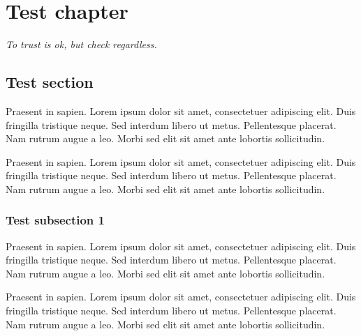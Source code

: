 

\chapter*{Test chapter}

\begin{flushright}
\parbox{0.6\textwidth}{
\emph{To trust is ok, but check regardless. \newline
{} } }
\end{flushright}

\section*{Test section}

Praesent in sapien. Lorem ipsum dolor sit amet, consectetuer adipiscing elit.
Duis fringilla tristique neque. Sed interdum libero ut metus. Pellentesque placerat.
Nam rutrum augue a leo. Morbi sed elit sit amet ante lobortis sollicitudin.

Praesent in sapien. Lorem ipsum dolor sit amet, consectetuer adipiscing elit.
Duis fringilla tristique neque. Sed interdum libero ut metus. Pellentesque placerat.
Nam rutrum augue a leo. Morbi sed elit sit amet ante lobortis sollicitudin.

\subsection*{Test subsection 1}
Praesent in sapien. Lorem ipsum dolor sit amet, consectetuer adipiscing elit.
Duis fringilla tristique neque. Sed interdum libero ut metus. Pellentesque placerat.
Nam rutrum augue a leo. Morbi sed elit sit amet ante lobortis sollicitudin.

Praesent in sapien. Lorem ipsum dolor sit amet, consectetuer adipiscing elit.
Duis fringilla tristique neque. Sed interdum libero ut metus. Pellentesque placerat.
Nam rutrum augue a leo. Morbi sed elit sit amet ante lobortis sollicitudin.

